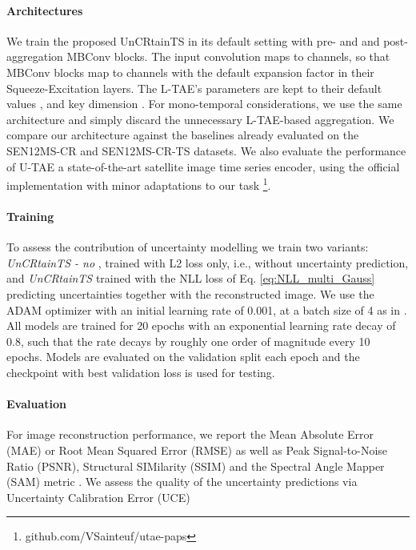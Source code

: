 \documentclass[10pt,twocolumn,letterpaper]{article}
\newcommand{\equaref}[1]{ Eq. \ref{#1}}
\begin{document}
\paragraph{\bf Architectures} We train the proposed UnCRtainTS in its default setting with  pre- and and  post-aggregation MBConv blocks. The input convolution maps to  channels, so that MBConv blocks map to  channels with the default expansion factor  in their Squeeze-Excitation layers. The L-TAE's parameters are kept to their default values , and key dimension . For mono-temporal considerations, we use the same architecture and simply discard the unnecessary L-TAE-based aggregation.  We compare our architecture against the baselines already evaluated on the SEN12MS-CR \cite{ebel2020multisensor} and SEN12MS-CR-TS \cite{ebel2022sen12ms} datasets.  We also evaluate the performance of U-TAE \cite{garnot2021panoptic} a state-of-the-art satellite image time series encoder, using the official implementation with minor adaptations to our task \footnote{github.com/VSainteuf/utae-paps}.  

\paragraph{\bf Training}
To assess the contribution of uncertainty modelling we train two variants: \textit{UnCRtainTS - no }, trained with L2 loss only, i.e., without uncertainty prediction, and \textit{UnCRtainTS} trained with the NLL loss of \equaref{eq:NLL_multi_Gauss} predicting uncertainties together with the reconstructed image. 
We use the ADAM optimizer \cite{kingma2014adam} with an initial learning rate of 0.001, at a batch size of 4 as in \cite{garnot2021panoptic}. All models are trained for 20 epochs with an exponential learning rate decay of 0.8, such that the rate decays by roughly one order of magnitude every 10 epochs. Models are evaluated on the validation split each epoch and the checkpoint with best validation loss is used for testing. 
\label{sub:training}


\paragraph{\bf Evaluation}\label{sub:evaluation} For image reconstruction performance, we report the Mean Absolute Error (MAE) or Root Mean Squared Error (RMSE) as well as Peak Signal-to-Noise Ratio (PSNR), Structural SIMilarity (SSIM) \cite{Wang_Bovik_Sheikh_Simoncelli_2004} and the Spectral Angle Mapper (SAM) metric \cite{kruse1993spectral}. We assess the quality of the uncertainty predictions via Uncertainty Calibration Error (UCE) \cite{guo2017calibration} 
\end{document}
